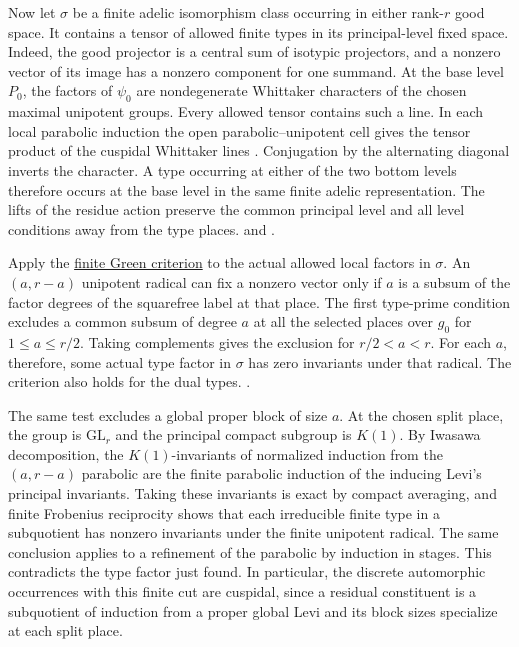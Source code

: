 Now let \(\sigma\) be a finite adelic isomorphism class occurring
in either rank-\(r\) good space. It contains a tensor of allowed
finite types in its principal-level fixed space. Indeed, the
good projector is a central sum of isotypic projectors, and a
nonzero vector of its image has a nonzero component for one
summand. At the base level \(P_0\), the factors of \(\psi_0\) are
nondegenerate Whittaker characters of the chosen maximal unipotent
groups. Every allowed tensor contains such a line. In each local
parabolic induction the open parabolic--unipotent cell gives the
tensor product of the cuspidal Whittaker lines
\cite{tr3green,tr3gelfand}. Conjugation by the alternating diagonal
inverts the character. A type occurring at either of the two bottom
levels therefore occurs at the base level in the same finite adelic
representation. The lifts of the residue action preserve the common
principal level and all level conditions away from the type places.
 and
.

Apply the \hyperlink{proof.green-unipotent-criterion}{finite Green
criterion} to the actual allowed local factors in \(\sigma\).
An \((a,r-a)\) unipotent radical can fix a nonzero vector only if
\(a\) is a subsum of the factor degrees of the squarefree label at
that place. The first type-prime condition excludes a
common subsum of degree \(a\) at all the selected places over
\(g_0\) for \(1\le a\le r/2\). Taking complements gives the
exclusion for \(r/2<a<r\). For each \(a\), therefore, some actual
type factor in \(\sigma\) has zero invariants under that radical.
The criterion also holds for the dual types.
.

The same test excludes a global proper block of size \(a\).
At the chosen split place, the group is \(\mathrm{GL}_r\) and
the principal compact subgroup is \(K(1)\). By Iwasawa
decomposition, the \(K(1)\)-invariants of normalized induction
from the \((a,r-a)\) parabolic are the finite parabolic
induction of the inducing Levi's principal invariants. Taking
these invariants is exact by compact averaging, and finite
Frobenius reciprocity shows that each irreducible finite type
in a subquotient has nonzero invariants under the finite
unipotent radical. The same conclusion applies to a refinement
of the parabolic by induction in stages. This contradicts the
type factor just found. In particular, the discrete automorphic
occurrences with this finite cut are cuspidal, since a residual
constituent is a subquotient of induction from a proper global
Levi and its block sizes specialize at each split place.

